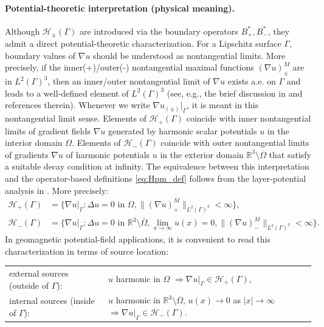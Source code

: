 \documentclass[a4paper, 11pt]{article}
\newcommand{\R}{\mathbb{R}}
\begin{document}
\paragraph{Potential-theoretic interpretation (physical meaning).}
Although $\mathcal H_\pm(\Gamma)$ are introduced via the boundary operators $B_+^\ast,B_-^\ast$, they admit a direct potential-theoretic characterization. For a Lipschitz surface $\Gamma$, boundary values of $\nabla u$ should be understood as nontangential limits. More precisely, if the inner(+)/outer(-) nontangential maximal functions $(\nabla u)_\pm^M$ are in $ L^2(\Gamma)^3$, then an inner/outer nontangential limit of $\nabla u$ exists a.e. on $\Gamma$ and leads to a well-defined element of $L^2(\Gamma)^3$ (see, e.g., the brief discussion in \cite{BGK,Hunt1968} and references therein). Whenever we write $\nabla u_{(\pm)}|_\Gamma$, it is meant in this nontangential limit sense. Elements of $\mathcal H_+(\Gamma)$ coincide with inner nontangential limits of gradient fields $\nabla u$ generated by harmonic scalar potentials $u$ in the interior domain $\Omega$. Elements of $\mathcal H_-(\Gamma)$ coincide with outer nontangential limits of gradients $\nabla u$ of harmonic potentials $u$ in the exterior domain $\R^3\setminus\overline{\Omega}$ that satisfy a suitable decay condition at infinity. The equivalence between this interpretation and the
operator-based definitions \eqref{eq:Hpm_def} follows from the layer-potential analysis in \cite{BGK}. More precisely:
\begin{align}
	\mathcal H_+(\Gamma)&=\{\nabla u|_\Gamma: \Delta u=0 \textrm{ in }\Omega, \|(\nabla u)_+^M\|_{L^2(\Gamma)^3}<\infty\},
	\\\mathcal H_-(\Gamma)&=\{\nabla u|_\Gamma: \Delta u=0 \textrm{ in }\R^3\setminus\overline{\Omega}, \lim_{x\to\infty} u(x)=0, \|(\nabla u)_-^M\|_{L^2(\Gamma)^3}<\infty\}.
\end{align}
In geomagnetic potential-field applications, it is convenient to read this characterization in terms of source location:
\begin{center}
\begin{tabular}{ll}
external sources (outside of $\Gamma$): & $u$ harmonic in $\Omega$ $\Rightarrow \nabla u|_\Gamma\in \mathcal H_+(\Gamma)$,\\
internal sources (inside of $\Gamma$): & $u$ harmonic in $\R^3\setminus\overline{\Omega}$, $u(x)\to 0$ as $|x|\to\infty$ $\Rightarrow\nabla u|_\Gamma\in \mathcal H_-(\Gamma).$
\end{tabular}
\end{center}
\end{document}
